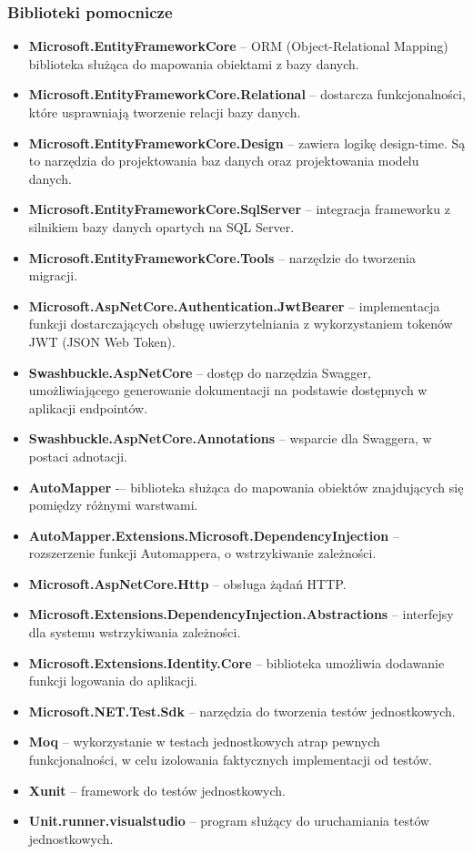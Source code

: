 \documentclass[a4paper,twoside,12pt]{book}
\begin{document}
\subsubsection{Biblioteki pomocnicze}
    \begin{itemize}
        \item \textbf{Microsoft.EntityFrameworkCore} -- ORM (Object-Relational Mapping) biblioteka służąca do mapowania obiektami z bazy danych.
        \item \textbf{Microsoft.EntityFrameworkCore.Relational} -- dostarcza funkcjonalności, które usprawniają tworzenie relacji bazy danych.
        \item \textbf{Microsoft.EntityFrameworkCore.Design} -- zawiera logikę design-time. Są to narzędzia do projektowania baz danych oraz projektowania modelu danych.
        \item \textbf{Microsoft.EntityFrameworkCore.SqlServer} -- integracja frameworku z silnikiem bazy danych opartych na SQL Server.
        \item \textbf{Microsoft.EntityFrameworkCore.Tools} -- narzędzie do tworzenia migracji.
        \item \textbf{Microsoft.AspNetCore.Authentication.JwtBearer} -- implementacja funkcji dostarczających obsługę uwierzytelniania z wykorzystaniem tokenów JWT (JSON Web Token).
        \item \textbf{Swashbuckle.AspNetCore} -- dostęp do narzędzia Swagger, umożliwiającego generowanie dokumentacji na podstawie dostępnych w aplikacji endpointów.
        \item \textbf{Swashbuckle.AspNetCore.Annotations} -- wsparcie dla Swaggera, w postaci adnotacji.
        \item \textbf{AutoMapper} -– biblioteka służąca do mapowania obiektów znajdujących się pomiędzy różnymi warstwami.
        \item \textbf{AutoMapper.Extensions.Microsoft.DependencyInjection} -- rozszerzenie funkcji Automappera, o wstrzykiwanie zależności.
        \item \textbf{Microsoft.AspNetCore.Http} -- obsługa żądań HTTP.
        \item \textbf{Microsoft.Extensions.DependencyInjection.Abstractions} -- interfejsy dla systemu wstrzykiwania zależności.
        \item \textbf{Microsoft.Extensions.Identity.Core} -- biblioteka umożliwia dodawanie funkcji logowania do aplikacji.
        \item \textbf{Microsoft.NET.Test.Sdk}  -- narzędzia do tworzenia testów jednostkowych.
        \item \textbf{Moq} -- wykorzystanie w testach jednostkowych atrap pewnych funkcjonalności, w celu izolowania faktycznych implementacji od testów.
        \item \textbf{Xunit} -- framework do testów jednostkowych.
        \item \textbf{Unit.runner.visualstudio} -- program służący do uruchamiania testów jednostkowych.
    \end{itemize}
\end{document}
